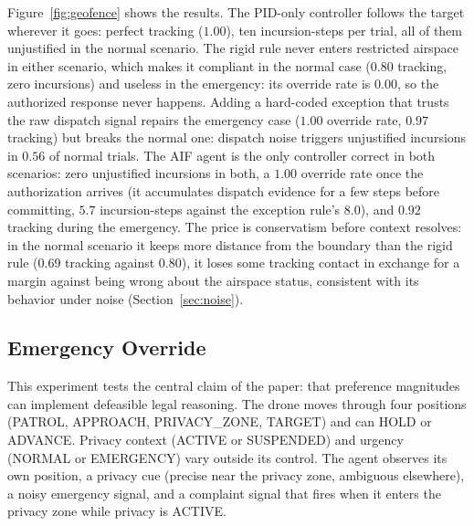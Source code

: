 \documentclass[10pt,twocolumn]{article}
\begin{document}
Figure~\ref{fig:geofence} shows the results. The PID-only controller follows the target wherever it goes: perfect tracking ($1.00$), ten incursion-steps per trial, all of them unjustified in the normal scenario. The rigid rule never enters restricted airspace in either scenario, which makes it compliant in the normal case ($0.80$ tracking, zero incursions) and useless in the emergency: its override rate is $0.00$, so the authorized response never happens. Adding a hard-coded exception that trusts the raw dispatch signal repairs the emergency case ($1.00$ override rate, $0.97$ tracking) but breaks the normal one: dispatch noise triggers unjustified incursions in $0.56$ of normal trials. The AIF agent is the only controller correct in both scenarios: zero unjustified incursions in both, a $1.00$ override rate once the authorization arrives (it accumulates dispatch evidence for a few steps before committing, $5.7$ incursion-steps against the exception rule's $8.0$), and $0.92$ tracking during the emergency. The price is conservatism before context resolves: in the normal scenario it keeps more distance from the boundary than the rigid rule ($0.69$ tracking against $0.80$), it loses some tracking contact in exchange for a margin against being wrong about the airspace status, consistent with its behavior under noise (Section~\ref{sec:noise}).




\subsection{Emergency Override}

This experiment tests the central claim of the paper: that preference magnitudes can implement defeasible legal reasoning. The drone moves through four positions (PATROL, APPROACH, PRIVACY\_ZONE, TARGET) and can HOLD or ADVANCE. Privacy context (ACTIVE or SUSPENDED) and urgency (NORMAL or EMERGENCY) vary outside its control. The agent observes its own position, a privacy cue (precise near the privacy zone, ambiguous elsewhere), a noisy emergency signal, and a complaint signal that fires when it enters the privacy zone while privacy is ACTIVE.
\end{document}
